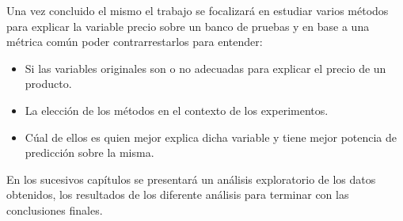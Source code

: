 Una vez concluido el mismo el trabajo se focalizará en estudiar varios métodos para explicar la variable precio sobre un banco de pruebas y en base a una métrica común poder contrarrestarlos para entender:


\begin{itemize}
    	\item Si las variables originales son o no adecuadas para explicar el precio de un producto.
    	\item La elección de los métodos en el contexto de los experimentos.
        \item Cúal de ellos es quien mejor explica dicha variable y tiene mejor potencia de predicción sobre la misma.
\end{itemize}



En los sucesivos capítulos se presentará un análisis exploratorio de los datos obtenidos, los resultados de los diferente análisis para terminar con las conclusiones finales.






